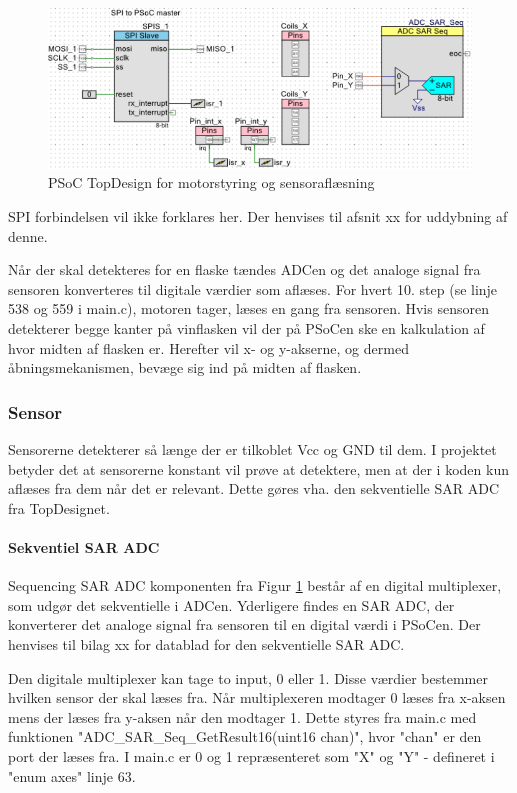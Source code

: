 \begin{figure}[H]
\includegraphics[scale=0.48]{Screenshots/PSoC_TopDesign_X_Y.png}
\caption{PSoC TopDesign for motorstyring og sensoraflæsning}
\label{PSoC_TopDesign_X_Y}
\end{figure}

SPI forbindelsen vil ikke forklares her. Der henvises til afsnit xx for uddybning af denne.

Når der skal detekteres for en flaske tændes ADCen og det analoge signal fra sensoren konverteres til digitale værdier som aflæses. For hvert 10. step (se linje 538 og 559 i main.c), motoren tager, læses en gang fra sensoren. Hvis sensoren detekterer begge kanter på vinflasken vil der på PSoCen ske en kalkulation af hvor midten af flasken er. Herefter vil x- og y-akserne, og dermed åbningsmekanismen, bevæge sig ind på midten af flasken.

\subsubsection{Sensor}

Sensorerne detekterer så længe der er tilkoblet Vcc og GND til dem. I projektet betyder det at sensorerne konstant vil prøve at detektere, men at der i koden kun aflæses fra dem når det er relevant. Dette gøres vha. den sekventielle SAR ADC fra TopDesignet.

\paragraph{Sekventiel SAR ADC} 

Sequencing SAR ADC komponenten fra Figur \ref{PSoC_TopDesign_X_Y} består af en digital multiplexer, som udgør det sekventielle i ADCen. Yderligere findes en SAR ADC, der konverterer det analoge signal fra sensoren til en digital værdi i PSoCen. Der henvises til bilag xx for datablad for den sekventielle SAR ADC.

Den digitale multiplexer kan tage to input, 0 eller 1. Disse værdier bestemmer hvilken sensor der skal læses fra. Når multiplexeren modtager 0 læses fra x-aksen mens der læses fra y-aksen når den modtager 1. Dette styres fra main.c med funktionen "ADC{\_}SAR{\_}Seq{\_}GetResult16(uint16 chan)", hvor "chan" er den port der læses fra. I main.c er 0 og 1 repræsenteret som "X" og "Y" - defineret i "enum axes" linje 63.

